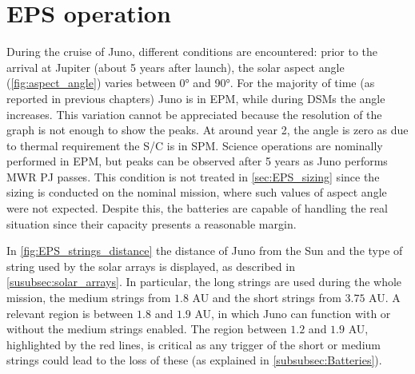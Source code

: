 \section{EPS operation}
\label{sec:eps_ops}

During the cruise of Juno, different conditions are encountered: prior to the arrival at Jupiter (about 5 years after launch), the solar aspect angle (\autoref{fig:aspect_angle}) varies between 0° and 90°.
For the majority of time (as reported in previous chapters) Juno is in EPM, while during DSMs the angle increases.
This variation cannot be appreciated because the resolution of the graph is not enough to show the peaks.
At around year 2, the angle is zero as due to thermal requirement the S/C is in SPM.
Science operations are nominally performed in EPM, but peaks can be observed after 5 years as Juno performs MWR PJ passes.
This condition is not treated in \autoref{sec:EPS_sizing} since the sizing is conducted on the nominal mission, where such values of aspect angle were not expected. Despite this, the batteries are capable of handling the real situation since their capacity presents a reasonable margin.

In \autoref{fig:EPS_strings_distance} the distance of Juno from the Sun and the type of string used by the solar arrays is displayed, as described in \autoref{susubsec:solar_arrays}.
In particular, the long strings are used during the whole mission, the medium strings from $1.8$ AU and the short strings from $3.75$ AU.
A relevant region is between $1.8$ and $1.9$ AU, in which Juno can function with or without the medium strings enabled.
The region between $1.2$ and $1.9$ AU, highlighted by the red lines, is critical as any trigger of the short or medium strings could lead to the loss of these (as explained in \autoref{subsubsec:Batteries}).

\vspace*{-3mm}
